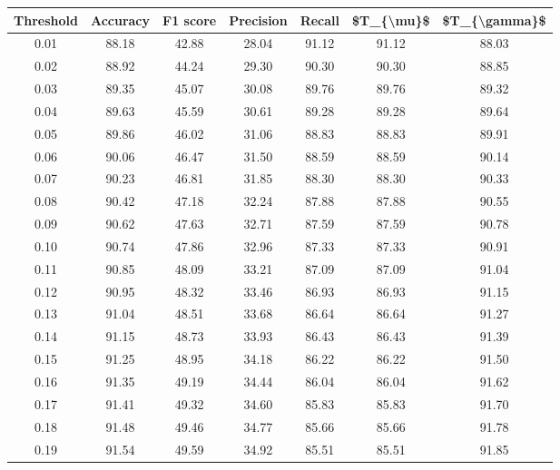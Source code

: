 \begin{tabular}{|c|c|c|c|c|c|c|}
\hline
 Threshold &  Accuracy &  F1 score &  Precision &  Recall &  \$T\_\{\textbackslash mu\}\$ &  \$T\_\{\textbackslash gamma\}\$ \\
\hline
      0.01 &     88.18 &     42.88 &      28.04 &   91.12 &      91.12 &         88.03 \\
      0.02 &     88.92 &     44.24 &      29.30 &   90.30 &      90.30 &         88.85 \\
      0.03 &     89.35 &     45.07 &      30.08 &   89.76 &      89.76 &         89.32 \\
      0.04 &     89.63 &     45.59 &      30.61 &   89.28 &      89.28 &         89.64 \\
      0.05 &     89.86 &     46.02 &      31.06 &   88.83 &      88.83 &         89.91 \\
      0.06 &     90.06 &     46.47 &      31.50 &   88.59 &      88.59 &         90.14 \\
      0.07 &     90.23 &     46.81 &      31.85 &   88.30 &      88.30 &         90.33 \\
      0.08 &     90.42 &     47.18 &      32.24 &   87.88 &      87.88 &         90.55 \\
      0.09 &     90.62 &     47.63 &      32.71 &   87.59 &      87.59 &         90.78 \\
      0.10 &     90.74 &     47.86 &      32.96 &   87.33 &      87.33 &         90.91 \\
      0.11 &     90.85 &     48.09 &      33.21 &   87.09 &      87.09 &         91.04 \\
      0.12 &     90.95 &     48.32 &      33.46 &   86.93 &      86.93 &         91.15 \\
      0.13 &     91.04 &     48.51 &      33.68 &   86.64 &      86.64 &         91.27 \\
      0.14 &     91.15 &     48.73 &      33.93 &   86.43 &      86.43 &         91.39 \\
      0.15 &     91.25 &     48.95 &      34.18 &   86.22 &      86.22 &         91.50 \\
      0.16 &     91.35 &     49.19 &      34.44 &   86.04 &      86.04 &         91.62 \\
      0.17 &     91.41 &     49.32 &      34.60 &   85.83 &      85.83 &         91.70 \\
      0.18 &     91.48 &     49.46 &      34.77 &   85.66 &      85.66 &         91.78 \\
      0.19 &     91.54 &     49.59 &      34.92 &   85.51 &      85.51 &         91.85 \\

\end{tabular}
